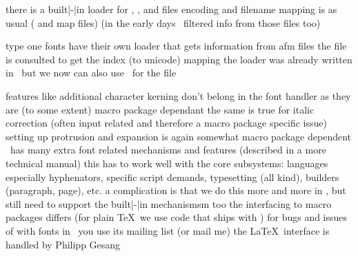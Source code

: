 \startsubject[title={tfm}]

    \startitemize
        \startitem
            there is a built|-|in loader for , , 
            and  files
        \stopitem
        \startitem
            encoding and filename mapping is as usual ( and \type
            {map} files)
        \stopitem
        \startitem
            (in the early days \ConTeXt\ filtered info from those 
            files too)
        \stopitem
    \stopitemize

\stopsubject

\startsubject[title={type one}]

    \startitemize
        \startitem
            type one fonts have their own loader that gets information from \type
            {afm} files
        \stopitem
        \startitem
            the  file is consulted to get the index (to unicode)
            mapping
        \stopitem
        \startitem
            the  loader was already written in \Lua\ but we now can also use
            \Lua\ for the  file
        \stopitem
    \stopitemize

\stopsubject

\stoptitle

\starttitle[title={remarks}]

    \startitemize
        \startitem
            features like additional character kerning don't belong in the font
            handler as they are (to some extent) macro package dependant
        \stopitem
        \startitem
            the same is true for italic correction (often input related and
            therefore a macro package specific issue)
        \stopitem
        \startitem
            setting up protrusion and expansion is again somewhat macro package
            dependent
        \stopitem
        \startitem
            \ConTeXt\ has many extra font related mechanisms and features
            (described in a more technical manual)
        \stopitem
        \blank
        \startitem
            this has to work well with the core subsystems: languages especially
            hyphenators, specific script demands, typesetting (all kind), builders
            (paragraph, page), etc.
        \stopitem
        \startitem
            a complication is that we do this more and more in \Lua, but still need to
            support the built|-|in mechanismsm too
        \stopitem
        \blank
        \startitem
            the interfacing to macro packages differs (for plain \TeX\ we use
            code that ships with \ConTeXt)
        \stopitem
        \startitem
            for bugs and issues of with fonts in \ConTeXt\ you use its mailing list (or
            mail me)
        \stopitem
        \startitem
            the \LaTeX\ interface is handled by Philipp Gesang
    \stopitemize

